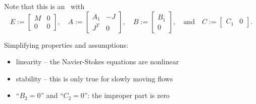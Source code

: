 Note that this is an \eabcsys~with
\begin{equation*}
	E:= \begin{bmatrix} M & 0 \\ 0 & 0 \end{bmatrix}, \quad
	A:= \begin{bmatrix} A_1 & -J \\ J^T & 0 \end{bmatrix}, \quad
	B:= \begin{bmatrix} B_1 \\ 0\end{bmatrix}, \quad \text{and}\quad
	C:= \begin{bmatrix} C_1 & 0 \end{bmatrix}.
\end{equation*}

Simplifying properties and assumptions:
\begin{itemize}
	\item linearity -- the Navier-Stokes equations are nonlinear
	\item stability -- this is only true for slowly moving flows
	\item ``$B_2=0$'' and ``$C_2=0$'': the improper part is zero
\end{itemize}


